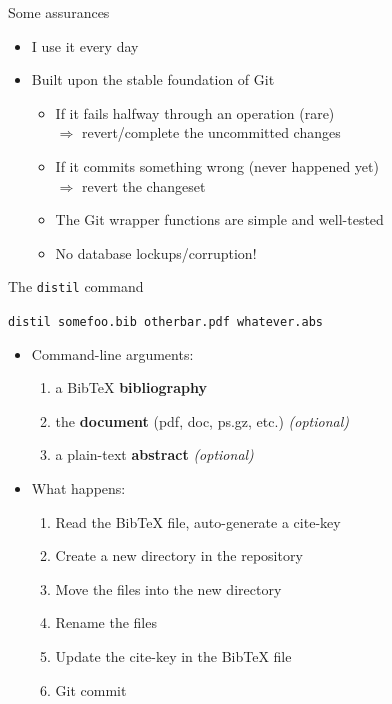 \documentclass[sansserif]{beamer}
\begin{document}
\begin{frame}{Some assurances}
	\begin{itemize}
		\item I use it every day \vspace{1em}
		\item Built upon the stable foundation of Git
		\begin{itemize}
			\item If it fails halfway through an operation (rare)
			\\ \hspace{2em} $\Rightarrow$ revert/complete the uncommitted changes \vspace{1em}
			\item If it commits something wrong (never happened yet)
			\\ \hspace{2em} $\Rightarrow$ revert the changeset \vspace{1em}
			\item The Git wrapper functions are simple and well-tested \vspace{1em}
			\item No database lockups/corruption!
		\end{itemize}
	\end{itemize}
\end{frame}

\begin{frame}{The {\tt distil} command}

	{\tt distil somefoo.bib otherbar.pdf whatever.abs} \vspace{2em}
	\begin{itemize}
		\item Command-line arguments:
		\begin{enumerate}
			\item a BibTeX \textbf{bibliography}
			\item the \textbf{document} (pdf, doc, ps.gz, etc.) \textit{(optional)}
			\item a plain-text \textbf{abstract} \textit{(optional)}
		\end{enumerate} \vspace{1em}
		\item What happens:
		\begin{enumerate}
			\item Read the BibTeX file, auto-generate a cite-key
			\item Create a new directory in the repository
			\item Move the files into the new directory
			\item Rename the files
			\item Update the cite-key in the BibTeX file
			\item Git commit
		\end{enumerate}
	\end{itemize}
\end{frame}
\end{document}

